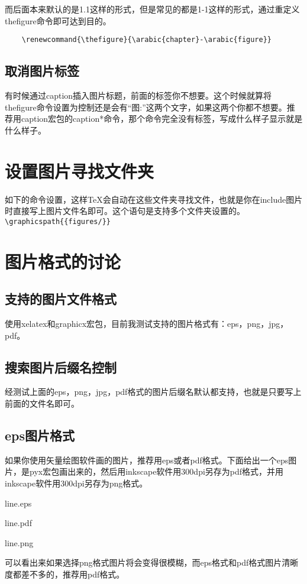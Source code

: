 \documentclass[11pt,oneside]{book}
\begin{document}
  而后面本来默认的是1.1这样的形式，但是常见的都是1-1这样的形式，通过重定义thefigure命令即可达到目的。
  \begin{Verbatim}
    \renewcommand{\thefigure}{\arabic{chapter}-\arabic{figure}}
  \end{Verbatim}

  \subsection{取消图片标签}
  有时候通过caption插入图片标题，前面的标签你不想要。这个时候就算将thefigure命令设置为控制还是会有“图:”这两个文字，如果这两个你都不想要。推荐用caption宏包的caption*命令，那个命令完全没有标签，写成什么样子显示就是什么样子。


  \section{设置图片寻找文件夹}
  如下的命令设置，这样\TeX 会自动在这些文件夹寻找文件，也就是你在include图片时直接写上图片文件名即可。这个语句是支持多个文件夹设置的。
  \verb+\graphicspath{{figures/}}+



  \section{图片格式的讨论}
  \subsection{支持的图片文件格式}
  使用xelatex和graphicx宏包，目前我测试支持的图片格式有：eps，png，jpg，pdf。

  \subsection{搜索图片后缀名控制}
  经测试上面的eps，png，jpg，pdf格式的图片后缀名默认都支持，也就是只要写上前面的文件名即可。


  \subsection{eps图片格式}
  如果你使用矢量绘图软件画的图片，推荐用eps或者pdf格式。下面给出一个eps图片，是pyx宏包画出来的，然后用inkscape软件用300dpi另存为pdf格式，并用inkscape软件用300dpi另存为png格式。
  \begin{linefig}{line.eps}
    \label{fig:line.eps}
    \caption{line.eps}
  \end{linefig}
  \begin{linefig}{line.pdf}
    \label{fig:line.pdf}
    \caption{line.pdf}
  \end{linefig}
  \begin{linefig}{line.png}
    \label{fig:line.png}
    \caption{line.png}
  \end{linefig}
  可以看出来如果选择png格式图片将会变得很模糊，而eps格式和pdf格式图片清晰度都差不多的，推荐用pdf格式。
\end{document}
